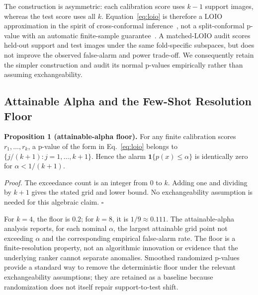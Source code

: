 The construction is asymmetric: each calibration score uses $k-1$ support images, whereas the test score uses all $k$. Equation~\eqref{eq:loio} is therefore a LOIO approximation in the spirit of cross-conformal inference~\cite{vovk2005,barber2021jackknife,hennhofer2024loio}, not a split-conformal p-value with an automatic finite-sample guarantee~\cite{bates2023testing,laxhammar2015inductive}. A matched-LOIO audit scores held-out support and test images under the same fold-specific subspaces, but does not improve the observed false-alarm and power trade-off. We consequently retain the simpler construction and audit its normal p-values empirically rather than assuming exchangeability.

\subsection{Attainable Alpha and the Few-Shot Resolution Floor}
\noindent\textbf{Proposition 1 (attainable-alpha floor).} For any finite calibration scores $r_1,\ldots,r_k$, a p-value of the form in Eq.~\eqref{eq:loio} belongs to $\{j/(k{+}1):j=1,\ldots,k{+}1\}$. Hence the alarm $\mathbf{1}\{p(x)\leq\alpha\}$ is identically zero for $\alpha<1/(k{+}1)$.

\noindent\emph{Proof.} The exceedance count is an integer from 0 to $k$. Adding one and dividing by $k+1$ gives the stated grid and lower bound. No exchangeability assumption is needed for this algebraic claim. \hfill$\square$

For $k=4$, the floor is $0.2$; for $k=8$, it is $1/9\approx0.111$. The attainable-alpha analysis reports, for each nominal $\alpha$, the largest attainable grid point not exceeding $\alpha$ and the corresponding empirical false-alarm rate. The floor is a finite-resolution property, not an algorithmic innovation or evidence that the underlying ranker cannot separate anomalies. Smoothed randomized p-values provide a standard way to remove the deterministic floor under the relevant exchangeability assumptions; they are retained as a baseline because randomization does not itself repair support-to-test shift.

